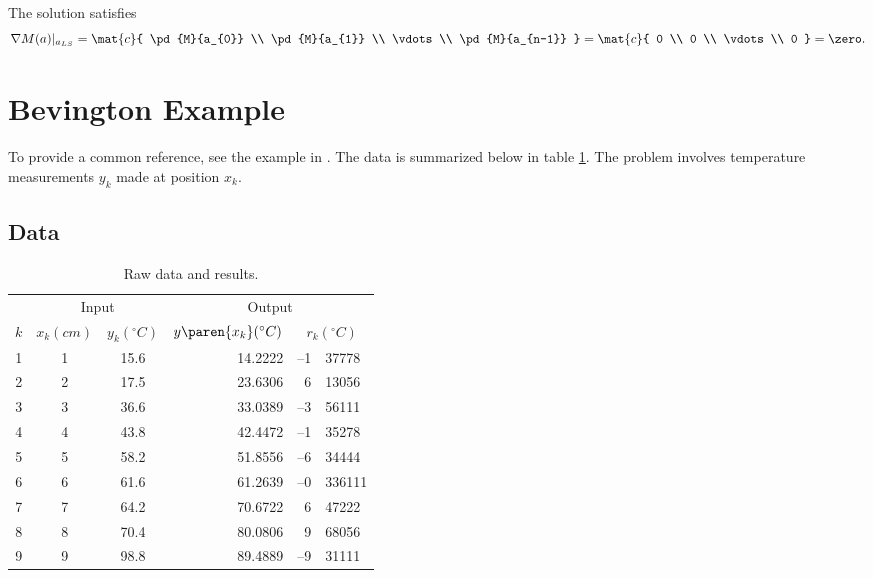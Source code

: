 The solution satisfies
  \begin{equation}   %
    \nabla M( a )\vert_{a_{LS}} = 
    \mat{c} { \pd{M}{a_{0}} \\ \pd{M}{a_{1}} \\ \vdots \\  \pd{M}{a_{n-1}} } =
    \mat{c} { 0 \\ 0 \\ \vdots \\ 0 } = \zero.
    \label{eq:merit}
  \end{equation}

\section{\label{sec:bevington example}Bevington Example}  %
To provide a common reference, see the example in \cite[ch 6]{Bevington}. The data is summarized below in table \ref{tab:bevington data and results}. The problem involves temperature measurements $y_{k}$ made at position $x_{k}$. 

\subsection{\label{ssec:modal data}Data}  %
\begin{table}[t]
	\begin{center}
		\begin{tabular}{rcc|rr@{.}l}
		  & \multicolumn{2}{c}{Input} &  \multicolumn{3}{c}{Output} \\
		  $k$ & $x_{k} (cm) $ & $y_{k} (^{\circ}C)$ & $y\paren{x_{k}} (^{\circ}C)$ & \multicolumn{2}{c}{$r_{k} (^{\circ}C)$} \\\hline
			 1 & 1 & 15.6 & 14.2222 & --1 & 37778 \\
			 2 & 2 & 17.5 & 23.6306 &   6 & 13056 \\
			 3 & 3 & 36.6 & 33.0389 & --3 & 56111 \\
			 4 & 4 & 43.8 & 42.4472 & --1 & 35278 \\
			 5 & 5 & 58.2 & 51.8556 & --6 & 34444 \\
			 6 & 6 & 61.6 & 61.2639 & --0 & 336111 \\
			 7 & 7 & 64.2 & 70.6722 &   6 & 47222 \\
			 8 & 8 & 70.4 & 80.0806 &   9 & 68056 \\
			 9 & 9 & 98.8 & 89.4889 & --9 & 31111 \\
		\end{tabular}
	\end{center}
	\caption{Raw data and results.}
	\label{tab:bevington data and results}
\end{table}%

